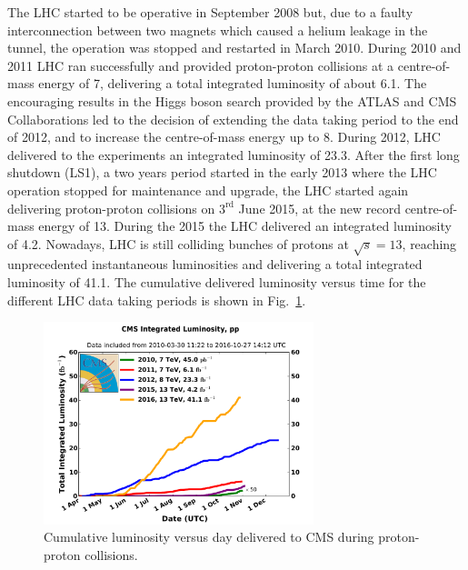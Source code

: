 The LHC started to be operative in September 2008 but, due to a faulty interconnection between two magnets which caused a helium leakage in the tunnel, the operation was stopped and restarted in March 2010. During 2010 and 2011 LHC ran successfully and provided proton-proton collisions at a centre-of-mass energy of 7\TeV, delivering a total integrated luminosity of about 6.1\ifb. The encouraging results in the Higgs boson search provided by the ATLAS and CMS Collaborations led to the decision of extending the data taking period to the end of 2012, and to increase the centre-of-mass energy up to 8\TeV. During 2012, LHC delivered to the experiments an integrated luminosity of 23.3\ifb. After the first long shutdown (LS1), a two years period started in the early 2013 where the LHC operation stopped for maintenance and upgrade, the LHC started again delivering proton-proton collisions on $3^\mathrm{rd}$ June 2015, at the new record centre-of-mass energy of 13\TeV. During the 2015 the LHC delivered an integrated luminosity of 4.2\ifb. Nowadays, LHC is still colliding bunches of protons at $\sqrt{s}=13$\TeV, reaching unprecedented instantaneous luminosities and delivering a total integrated luminosity of 41.1\ifb. The cumulative delivered luminosity versus time for the different LHC data taking periods is shown in Fig.~\ref{fig:LHClumi}.

\begin{figure}[htb]
\centering
\includegraphics[width=0.7\textwidth]{images/LHClumi.pdf}
\caption{Cumulative luminosity versus day delivered to CMS during proton-proton collisions.}\label{fig:LHClumi}
\end{figure}

